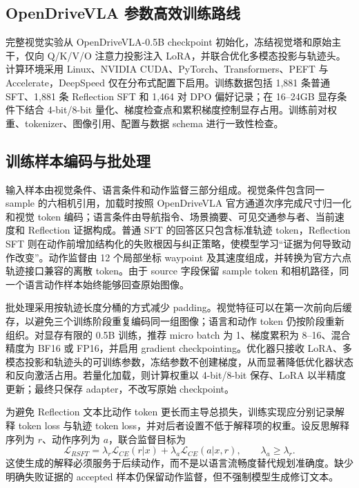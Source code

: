 \documentclass[UTF8,a4paper,12pt,fontset=fandol]{ctexart}
\begin{document}
\subsection{OpenDriveVLA 参数高效训练路线}
完整视觉实验从 OpenDriveVLA-0.5B checkpoint 初始化，冻结视觉塔和原始主干，仅向 Q/K/V/O 注意力投影注入 LoRA，并联合优化多模态投影与轨迹头。计算环境采用 Linux、NVIDIA CUDA、PyTorch、Transformers、PEFT 与 Accelerate，DeepSpeed 仅在分布式配置下启用。训练数据包括 1,881 条普通 SFT、1,881 条 Reflection SFT 和 1,464 对 DPO 偏好记录；在 16--24GB 显存条件下结合 4-bit/8-bit 量化、梯度检查点和累积梯度控制显存占用。训练前对权重、tokenizer、图像引用、配置与数据 schema 进行一致性检查。

\subsection{训练样本编码与批处理}
输入样本由视觉条件、语言条件和动作监督三部分组成。视觉条件包含同一 sample 的六相机引用，加载时按照 OpenDriveVLA 官方通道次序完成尺寸归一化和视觉 token 编码；语言条件由导航指令、场景摘要、可见交通参与者、当前速度和 Reflection 证据构成。普通 SFT 的回答区只包含标准轨迹 token，Reflection SFT 则在动作前增加结构化的失败根因与纠正策略，使模型学习“证据为何导致动作改变”。动作监督由 12 个局部坐标 waypoint 及其速度组成，并转换为官方六点轨迹接口兼容的离散 token。由于 source 字段保留 sample token 和相机路径，同一个语言动作样本始终能够回查原始图像。

批处理采用按轨迹长度分桶的方式减少 padding。视觉特征可以在第一次前向后缓存，以避免三个训练阶段重复编码同一组图像；语言和动作 token 仍按阶段重新组织。对显存有限的 0.5B 训练，推荐 micro batch 为 1、梯度累积为 8--16、混合精度为 BF16 或 FP16，并启用 gradient checkpointing。优化器只接收 LoRA、多模态投影和轨迹头的可训练参数，冻结参数不创建梯度，从而显著降低优化器状态和反向激活占用。若量化加载，则计算权重以 4-bit/8-bit 保存、LoRA 以半精度更新；最终只保存 adapter，不改写原始 checkpoint。

为避免 Reflection 文本比动作 token 更长而主导总损失，训练实现应分别记录解释 token loss 与轨迹 token loss，并对后者设置不低于解释项的权重。设反思解释序列为 $r$、动作序列为 $a$，联合监督目标为
\begin{equation}
\mathcal{L}_{RSFT}=\lambda_r\mathcal{L}_{CE}(r|x)+\lambda_a\mathcal{L}_{CE}(a|x,r),\qquad \lambda_a\geq\lambda_r.
\end{equation}
这使生成的解释必须服务于后续动作，而不是以语言流畅度替代规划准确度。缺少明确失败证据的 accepted 样本仍保留动作监督，但不强制模型生成修订文本。
\end{document}
